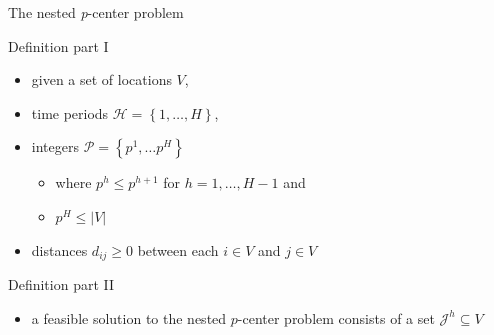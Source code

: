 \documentclass[utf8,aspectratio=1610,ngerman,english]{beamer}
\begin{document}
\begin{frame}{The nested \textit{p}-center problem}
    \begin{minipage}{0.48\textwidth}
        \begin{block}{Definition part I}
            \vspace*{13pt}
            \begin{itemize}
                \setlength\itemsep{1em}
                \item given a set of locations $V$, \pause
                \item time periods $\mathcal H = \left \{1,\dots,H \right \}$, \pause
                \item integers $\mathcal P = \left \{p^1, \dots p^H \right \}$   \pause
                      \begin{itemize}
                          \item where $p^h \leq p^{h+1}$ for $h = 1, \dots, H-1$ and
                          \item $p^H \leq \left\lvert V \right\rvert$
                      \end{itemize} \pause
                \item distances $d_{ij} \geq 0$ between each $i \in V$ and $j \in V$ \pause
            \end{itemize}
            \vspace{13pt}
        \end{block}
    \end{minipage}
    \begin{minipage}{0.48\textwidth}
        \begin{block}{Definition part II}
            \begin{itemize}
                \item a feasible solution to the nested $p$-center problem consists of a set $\mathcal J^h \subseteq V$ \pause

\end{itemize}
\end{block}
\end{minipage}
\end{frame}
\end{document}
